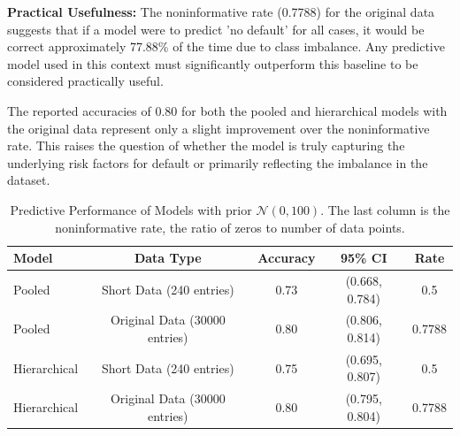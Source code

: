 \documentclass[a4paper]{artikel3}
\begin{document}
\textbf{Practical Usefulness:}
The noninformative rate (0.7788) for the original data suggests that if a model were to predict 'no default' for all cases, it would be correct approximately 77.88\% of the time due to class imbalance. Any predictive model used in this context must significantly outperform this baseline to be considered practically useful.

The reported accuracies of 0.80 for both the pooled and hierarchical models with the original data represent only a slight improvement over the noninformative rate. This raises the question of whether the model is truly capturing the underlying risk factors for default or primarily reflecting the imbalance in the dataset.

\begin{table}[h!]
  \centering
  \caption{Predictive Performance of Models with prior $\mathcal{N}(0, 100)$. The last column is the noninformative rate, the ratio of zeros to number of data points.}
  \label{tab:performance}
  \begin{tabular}{lcccc}
    \toprule
    \textbf{Model} & \textbf{Data Type} & \textbf{Accuracy} & \textbf{95\% CI} & \textbf{Rate} \\
    \midrule
    Pooled & Short Data (240 entries) & 0.73 & (0.668, 0.784) & 0.5 \\
    Pooled & Original Data (30000 entries) & 0.80 & (0.806, 0.814) & 0.7788 \\
    \addlinespace
    Hierarchical & Short Data (240 entries) & 0.75 & (0.695, 0.807) & 0.5 \\
    Hierarchical & Original Data (30000 entries) & 0.80 & (0.795, 0.804) & 0.7788 \\
    \bottomrule
  \end{tabular}
\end{table}
\end{document}
